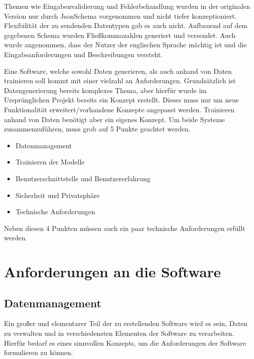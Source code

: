 Themen wie Eingabenvalidierung und Fehlerbehandlung wurden in der originalen Version nur durch JsonSchema vorgenommen und nicht tiefer konzeptioniert.
Flexibilität der zu sendenden Datentypen gab es auch nicht. Aufbauend auf dem gegebenen Schema wurden Fließkommazahlen generiert und versendet.
Auch wurde angenommen, dass der Nutzer der englischen Sprache mächtig ist und die Eingabeanforderungen und Beschreibungen versteht.





\label{cha:Anforderungsanalyse}
Eine Software, welche sowohl Daten generieren, als auch anhand von Daten trainieren soll kommt mit einer vielzahl an Anforderungen.
Grundsätzlich ist Datengenerierung bereits komplexes Thema, aber hierfür wurde im Ursprünglichen Projekt bereits ein Konzept erstellt. Dieses muss nur um neue Funktionalität erweitert/vorhandene Konzepte angepasst werden.
Trainieren anhand von Daten benötigt aber ein eigenes Konzept. Um beide Systeme zusammenzuführen, muss grob auf 5 Punkte geachtet werden.

\begin{itemize}
    \item Datenmanagement
    \item Trainieren der Modelle
    \item Benutzerschnittstelle und Benutzererfahrung
    \item Sicherheit und Privatsphäre
    \item Technische Anforderungen
\end{itemize}

Neben diesen 4 Punkten müssen auch ein paar technische Anforderungen erfüllt werden.


\section{Anforderungen an die Software}
\subsection{Datenmanagement}
\label{cha:Anforderungsanalyse:Datenmanagement}
Ein großer und elementarer Teil der zu erstellenden Software wird es sein, Daten zu verwalten und in verschiedensten Elementen der Software zu verarbeiten. Hierfür bedarf es eines sinnvollen Konzepts, 
um die Anforderungen der Software formulieren zu können.

